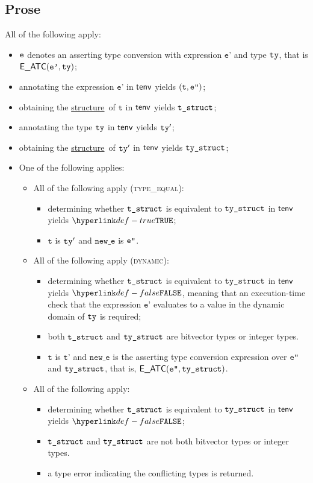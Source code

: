 \documentclass{book}
\newcommand\ProseOrTypeError[0]{\ProseTerminateAs{\TypeErrorConfig}}
\newcommand\structure[0]{\hyperlink{def-structure}{structure}}
\newcommand\vt[0]{\texttt{t}}
\newcommand\newe[0]{\texttt{new\_e}}
\newcommand\vep[0]{\texttt{e'}}
\newcommand\vtp[0]{\texttt{t'}}
\begin{document}
\subsection{Prose}
All of the following apply:
\begin{itemize}
  \item $\texttt{e}$ denotes an asserting type conversion with expression $\vep$ and type $\texttt{ty}$, that is $\EATC(\vep, \tty)$;
  \item annotating the expression $\vep$ in $\textsf{tenv}$ yields $(\vt, \vepp)$\ProseOrTypeError;
  \item obtaining the \structure\ of $\vt$ in $\textsf{tenv}$ yields $\texttt{t\_struct}$\ProseOrTypeError;
  \item annotating the type $\texttt{ty}$ in $\textsf{tenv}$ yields $\texttt{ty}'$\ProseOrTypeError;
  \item obtaining the \structure\ of $\texttt{ty}'$ in $\textsf{tenv}$ yields $\texttt{ty\_struct}$\ProseOrTypeError;
  \item One of the following applies:
  \begin{itemize}
  \item All of the following apply (\textsc{type\_equal}):
  \begin{itemize}
    \item determining whether $\texttt{t\_struct}$ is equivalent to $\texttt{ty\_struct}$ in $\textsf{tenv}$ \\ yields $\True$;
    \item $\vt$ is $\texttt{ty}'$ and $\newe$ is $\texttt{e''}$.
  \end{itemize}
  \item All of the following apply (\textsc{dynamic}):
    \begin{itemize}
      \item determining whether $\texttt{t\_struct}$ is equivalent to $\texttt{ty\_struct}$ in $\textsf{tenv}$ \\ yields $\False$,
      meaning that an execution-time check that the expression $\vep$ evaluates to a value in the
      dynamic domain of $\texttt{ty}$ is required;
      \item both $\texttt{t\_struct}$ and $\texttt{ty\_struct}$ are bitvector types or integer types.
      \item $\vt$ is $\vtp$ and $\newe$ is the asserting type conversion expression over $\texttt{e''}$ \\ and
      $\texttt{ty\_struct}$, that is, $\textsf{E\_ATC}(\texttt{e''}, \texttt{ty\_struct})$.
    \end{itemize}
  \item All of the following apply:
    \begin{itemize}
    \item determining whether $\texttt{t\_struct}$ is equivalent to $\texttt{ty\_struct}$ in $\textsf{tenv}$ \\ yields $\False$;
    \item $\texttt{t\_struct}$ and $\texttt{ty\_struct}$ are not both bitvector types or integer types.
    \item a type error indicating the conflicting types is returned.
    \end{itemize}
  \end{itemize}
\end{itemize}
\end{document}
